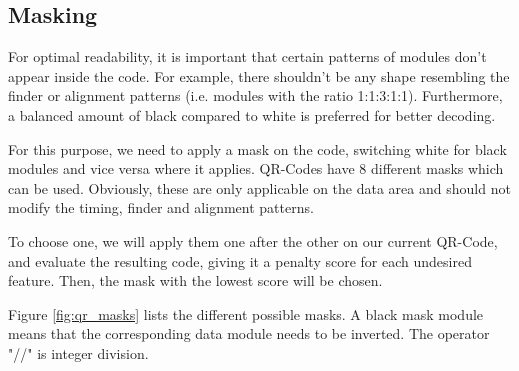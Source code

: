 \subsection{Masking}
\label{ssec:qr_masking}

For optimal readability, it is important that certain patterns of modules don't appear inside the code. For example, there shouldn't be any shape resembling the finder or alignment patterns (i.e. modules with the ratio 1:1:3:1:1). Furthermore, a balanced amount of black compared to white is preferred for better decoding.

For this purpose, we need to apply a mask on the code, switching white for black modules and vice versa where it applies. QR-Codes have 8 different masks which can be used. Obviously, these are only applicable on the data area and should not modify the timing, finder and alignment patterns.

To choose one, we will apply them one after the other on our current QR-Code, and evaluate the resulting code, giving it a penalty score for each undesired feature. Then, the mask with the lowest score will be chosen.

Figure \ref{fig:qr_masks} lists the different possible masks.
A black mask module means that the corresponding data module needs to be inverted.
The operator "//" is integer division.

